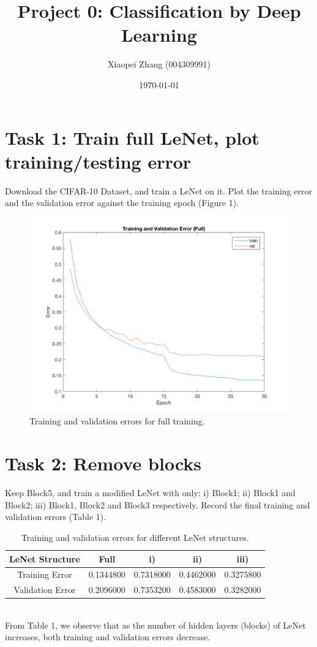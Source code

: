 \documentclass[10pt]{article}
\title{Project 0: Classification by Deep Learning}
\author{Xiaopei Zhang (004309991)}
\date{\today}
\begin{document}
\maketitle
\section*{\small{Task 1: Train full LeNet, plot training/testing error}}
	Download the CIFAR-10 Dataset, and train a LeNet on it. Plot the training error and the validation error against the training epoch (Figure 1). \\
	\begin{figure}[h]
		\includegraphics[width=\textwidth]{full_error}
		\caption{Training and validation errors for full training.}
		\label{1}
	\end{figure}
\section*{\small{Task 2: Remove blocks}}
	Keep Block5, and train a modified LeNet with only: i) Block1; ii) Block1 and Block2; iii) Block1, Block2 and Block3 respectively. Record the final training and validation errors (Table 1). \\
	\begin{table}
 		\centering
 		\begin{tabular}{|c|c|c|c|c|}
		\hline
		LeNet Structure & Full & i) & ii) & iii) \\ \hline
		Training Error & 0.1344800 & 0.7318000 & 0.4462000 & 0.3275800  \\ \hline
		Validation Error & 0.2096000 & 0.7353200 & 0.4583000 & 0.3282000 \\ \hline
 		\end{tabular}
		\caption{Training and validation errors for different LeNet structures.}\label{tab1}
	\end{table}\\
	From Table 1, we observe that as the number of hidden layers (blocks) of LeNet increases, both training and validation errors decrease.
\end{document}
